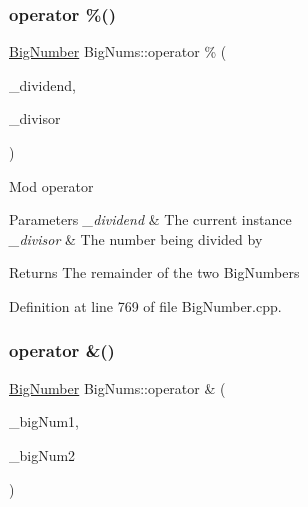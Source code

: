 \mbox{\label{namespace_big_nums_ae7b3fba15d931353b415566997ad2bd2}} 
\subsubsection{\texorpdfstring{operator \%()}{operator \%()}}
{\footnotesize\ttfamily \mbox{\hyperlink{class_big_nums_1_1_big_number}{Big\+Number}} Big\+Nums\+::operator \% (\begin{DoxyParamCaption}\item[{\mbox{\hyperlink{class_big_nums_1_1_big_number}{Big\+Number}}}]{\+\_\+dividend,  }\item[{const \mbox{\hyperlink{class_big_nums_1_1_big_number}{Big\+Number}} \&}]{\+\_\+divisor }\end{DoxyParamCaption})}

Mod operator 
\begin{DoxyParams}{Parameters}
{\em \+\_\+dividend} & The current instance \\
\hline
{\em \+\_\+divisor} & The number being divided by \\
\hline
\end{DoxyParams}
\begin{DoxyReturn}{Returns}
The remainder of the two Big\+Numbers 
\end{DoxyReturn}


Definition at line 769 of file Big\+Number.\+cpp.

\mbox{\label{namespace_big_nums_ab5839eac3b74ef69240811d21f09377c}} 
\subsubsection{\texorpdfstring{operator \&()}{operator \&()}}
{\footnotesize\ttfamily \mbox{\hyperlink{class_big_nums_1_1_big_number}{Big\+Number}} Big\+Nums\+::operator \& (\begin{DoxyParamCaption}\item[{const \mbox{\hyperlink{class_big_nums_1_1_big_number}{Big\+Number}} \&}]{\+\_\+big\+Num1,  }\item[{const \mbox{\hyperlink{class_big_nums_1_1_big_number}{Big\+Number}} \&}]{\+\_\+big\+Num2 }\end{DoxyParamCaption})}


